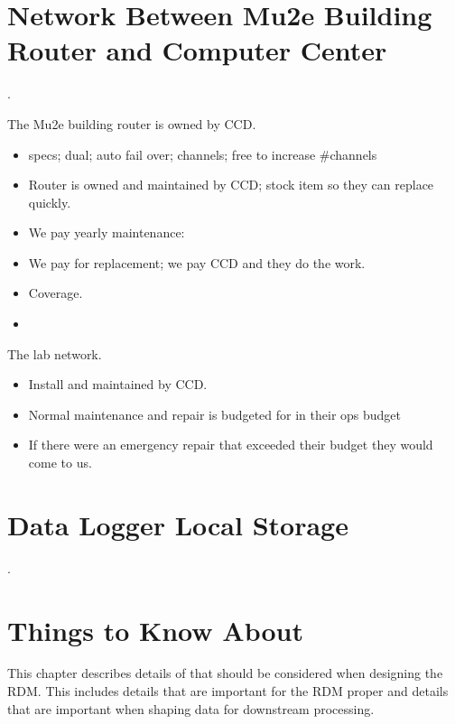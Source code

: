 \appendix

\chapter{Network Between Mu2e Building Router and Computer Center}
\label{app:RouterAndNetwork}.

The Mu2e building router is owned by CCD.
\begin{itemize}
\item specs; dual; auto fail over; channels; free to increase \#channels
\item Router is owned and maintained by CCD; stock item so they can replace quickly.
\item We pay yearly maintenance: 
\item We pay for replacement; we pay CCD and they do the work. 
\item {} Coverage.
\item {}
\end{itemize}


The lab network.
\begin{itemize}
\item Install and maintained by CCD.
\item Normal maintenance and repair is budgeted for in their ops budget
\item If there were an emergency repair that exceeded their budget they would come to us. 
\end{itemize}

\chapter{Data Logger Local Storage}
\label{app:DataLoggerLocalStorage}

.

\chapter{Things to Know About \art}

This chapter describes details of \art that should be considered when
designing the RDM.  This includes details that are important for the RDM
proper and details that are important when shaping data for downstream
processing.

